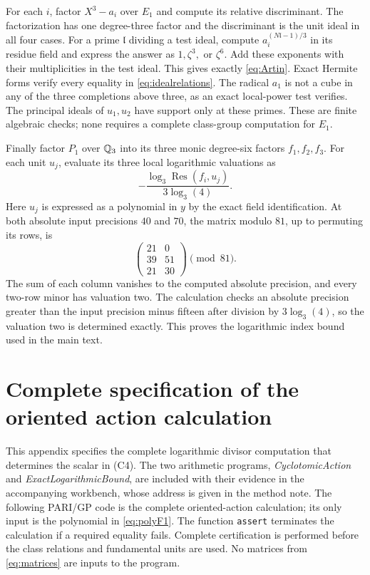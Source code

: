 \documentclass[11pt]{article}
\theoremstyle{remark}\newtheorem{remark}[theorem]{Remark}
\begin{document}
For each $i$, factor $X^3-a_i$ over $E_1$ and compute its relative discriminant.
The factorization has one degree-three factor and the discriminant is the unit ideal in all four cases.
For a prime $\mathfrak l$ dividing a test ideal, compute $a_i^{(N\mathfrak l-1)/3}$ in its residue field and express the answer as $1,\zeta^3,$ or $\zeta^6$.
Add these exponents with their multiplicities in the test ideal.
This gives exactly \eqref{eq:Artin}.
Exact Hermite forms verify every equality in \eqref{eq:idealrelations}.
The radical $a_1$ is not a cube in any of the three completions above three, as an exact local-power test verifies.
The principal ideals of $u_1,u_2$ have support only at these primes.
These are finite algebraic checks; none requires a complete class-group computation for $E_1$.

Finally factor $P_1$ over $\mathbb Q_3$ into its three monic degree-six factors $f_1,f_2,f_3$.
For each unit $u_j$, evaluate its three local logarithmic valuations as
\[
 -\frac{\log_3\operatorname{Res}(f_i,u_j)}{3\log_3(4)}.
\]
Here $u_j$ is expressed as a polynomial in $y$ by the exact field identification.
At both absolute input precisions $40$ and $70$, the matrix modulo $81$, up to permuting its rows, is
\[
 \begin{pmatrix}21&0\\39&51\\21&30\end{pmatrix}\pmod{81}.
\]
The sum of each column vanishes to the computed absolute precision, and every two-row minor has valuation two.
The calculation checks an absolute precision greater than the input precision minus fifteen after division by $3\log_3(4)$, so the valuation two is determined exactly.
This proves the logarithmic index bound used in the main text.

\section{Complete specification of the oriented action calculation}
\label{app:action}
This appendix specifies the complete logarithmic divisor computation that determines the scalar in (C4).
The two arithmetic programs, \emph{CyclotomicAction} and \emph{ExactLogarithmicBound}, are included with their evidence in the accompanying workbench, whose address is given in the method note.
The following PARI/GP code is the complete oriented-action calculation; its only input is the polynomial in \eqref{eq:polyF1}.
The function \texttt{assert} terminates the calculation if a required equality fails.
Complete certification is performed before the class relations and fundamental units are used.
No matrices from \eqref{eq:matrices} are inputs to the program.
\end{document}
